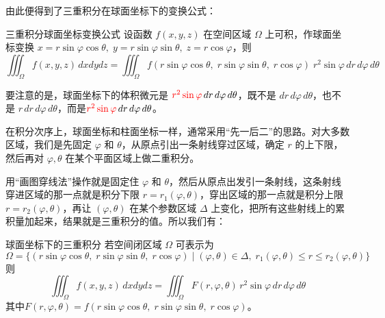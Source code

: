 \begin{center}
\end{center}


由此便得到了三重积分在球面坐标下的变换公式：

\begin{theorem}{三重积分球面坐标变换公式}{}
设函数 \(f(x,y,z)\) 在空间区域 \(\Omega\) 上可积，作球面坐标变换 \(x=r\sin\varphi\cos\theta,\;y=r\sin\varphi\sin\theta,\;z=r\cos\varphi\)，则
\[
\iiint_{\Omega} f(x,y,z)\,dxdydz
= \iiint_{\Omega} f(r\sin\varphi\cos\theta,\; r\sin\varphi\sin\theta,\; r\cos\varphi)\;
r^2\sin\varphi\,dr\,d\varphi\,d\theta
\]
\end{theorem}


要注意的是，球面坐标下的体积微元是 \(\textcolor{red}{r^2\sin\varphi}\,dr\,d\varphi\,d\theta\)，既不是 \(dr\,d\varphi\,d\theta\)，也不是 \(r\,dr\,d\varphi\,d\theta\)，而是\(\textcolor{red}{r^2\sin\varphi}\,dr\,d\varphi\,d\theta\)。

在积分次序上，球面坐标和柱面坐标一样，通常采用“先一后二”的思路。对大多数区域，我们是先固定 \(\varphi\) 和 \(\theta\)，从原点引出一条射线穿过区域，确定 \(r\) 的上下限，然后再对 \(\varphi,\theta\) 在某个平面区域上做二重积分。

用“画图穿线法”操作就是固定住 \(\varphi\) 和 \(\theta\)，然后从原点出发引一条射线，这条射线穿进区域的那一点就是积分下限 \(r=r_1(\varphi,\theta)\)，穿出区域的那一点就是积分上限 \(r=r_2(\varphi,\theta)\)，再让 \((\varphi,\theta)\) 在某个参数区域 \(\Delta\) 上变化，把所有这些射线上的累积量加起来，结果就是三重积分的值。所以我们有：
\begin{theorem}{球面坐标下的三重积分}{}
若空间闭区域 \(\Omega\) 可表示为
\[
\Omega = \{(r\sin\varphi\cos\theta,\; r\sin\varphi\sin\theta,\; r\cos\varphi) \mid
(\varphi,\theta)\in\Delta,\; r_1(\varphi,\theta)\le r\le r_2(\varphi,\theta)\}
\]
则
\[
\iiint_{\Omega} f(x,y,z)\,dxdydz
= \iiint_{\Omega} F(r,\varphi,\theta)\,r^2\sin\varphi\,dr\,d\varphi\,d\theta
\]
其中\(F(r,\varphi,\theta)=f(r\sin\varphi\cos\theta,\; r\sin\varphi\sin\theta,\; r\cos\varphi)\)。
\end{theorem}

